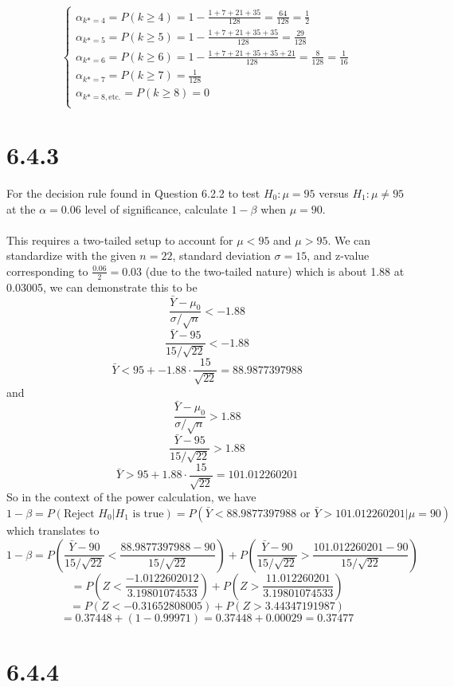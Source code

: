 \documentclass{article}
\begin{document}
{\begin{equation*}
\begin{cases}
\alpha_{k* = 4} = P(k \geq 4) = 1 - \frac{1 + 7 + 21 + 35}{128} = \frac{64}{128} = \frac{1}{2} \\
\alpha_{k* = 5} = P(k \geq 5) = 1 - \frac{1 + 7 + 21 + 35 + 35}{128} = \frac{29}{128} \\
\alpha_{k* = 6} = P(k \geq 6) = 1 - \frac{1 + 7 + 21 + 35 + 35 + 21}{128} = \frac{8}{128} = \frac{1}{16} \\
\alpha_{k* = 7} = P(k \geq 7) = \frac{1}{128} \\
\alpha_{k* = 8, \text{etc.}} = P(k \geq 8) = 0 \\
\end{cases}
\end{equation*}

\section*{6.4.3}
For the decision rule found in Question 6.2.2 to test \(H_0: \mu = 95\) versus \(H_1:\mu \neq 95\) at the \(\alpha = 0.06\) level of significance, calculate \(1 - \beta\) when \(\mu = 90\).
\\
\\
This requires a two-tailed setup to account for \(\mu < 95\) and \(\mu > 95\). We can standardize with the given \(n=22\), standard deviation \(\sigma = 15\), and z-value corresponding to \(\frac{0.06}{2} = 0.03\) (due to the two-tailed nature) which is about 1.88 at 0.03005, we can demonstrate this to be 
\[
\frac{\bar{Y} - \mu_0}{\sigma/\sqrt{n}} < -1.88
\]
\[
\frac{\bar{Y} - 95}{15 / \sqrt{22}} < -1.88
\]
\[
\bar{Y} < 95 + -1.88 \cdot \frac{15}{\sqrt{22}} = 88.9877397988
\]
and 
\[
\frac{\bar{Y} - \mu_0}{\sigma/\sqrt{n}} > 1.88
\]
\[
\frac{\bar{Y} - 95}{15 / \sqrt{22}} > 1.88
\]
\[
\bar{Y} > 95 + 1.88 \cdot \frac{15}{\sqrt{22}} = 101.012260201
\]
So in the context of the power calculation, we have \(1 - \beta = P(\text{Reject }H_0 | H_1 \text{ is true}) = P(\bar{Y} < 88.9877397988 \text{ or } \bar{Y} > 101.012260201 | \mu = 90) \) which translates to 
\[
1 - \beta = P(\frac{\bar{Y} - 90}{15 / \sqrt{22}} < \frac{88.9877397988 - 90}{15 / \sqrt{22}}) + P(\frac{\bar{Y} - 90}{15 / \sqrt{22}} > \frac{101.012260201 - 90}{15 / \sqrt{22}})
\]
\[
= P(Z < \frac{-1.0122602012}{3.19801074533}) + P(Z > \frac{11.012260201}{3.19801074533})
\]
\[
= P(Z < -0.31652808005) + P(Z > 3.44347191987)
\]
\[
= 0.37448 + (1 - 0.99971) = 0.37448 + 0.00029 = 0.37477
\]

\section*{6.4.4}

}
\end{document}
